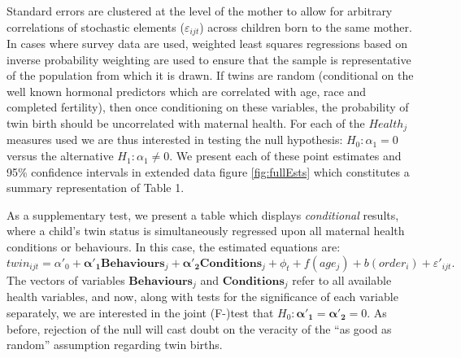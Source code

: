\documentclass{nature}
\begin{document}
\begin{linenumbers}
Standard errors are clustered at the level of the mother to allow for arbitrary correlations of stochastic elements ($\varepsilon_{ijt}$) across children born to the same mother. In cases where survey data are used, weighted least squares regressions based on inverse probability weighting are used to ensure that the sample is representative of the population from which it is drawn. If twins are random (conditional on the well known  hormonal predictors which are correlated with age, race and completed fertility\cite{Hall2003}), then once conditioning on these variables, the probability of twin birth should be uncorrelated with maternal health. For each of the $Health_j$ measures used we are thus interested in testing the null hypothesis: $H_0: \alpha_1=0$ versus the alternative $H_1: \alpha_1\neq0$.  We present each of these point estimates and 95\% confidence intervals in extended data figure \ref{fig:fullEsts} which constitutes a summary representation of Table 1. %

As a supplementary test, we present a table which displays \emph{conditional} results, where a child's twin status is simultaneously regressed upon all maternal health conditions or behaviours.  In this case, the estimated equations are:
\begin{equation}
  \label{reg:twincond}
  twin_{ijt}=\alpha'_0 + \bm{\alpha'_1} \bm{Behaviours}_j + \bm{\alpha'_2} \bm{Conditions}_j + \phi_t + f(age_j) + b(order_i) + \varepsilon'_{ijt}.
\end{equation}
The vectors of variables $\bm{Behaviours}_j$ and $\bm{Conditions}_j$ refer to all available health variables, and now, along with tests for the significance of each variable separately, we are interested in the joint (F-)test that $H_0:\bm{\alpha'_1}=\bm{\alpha'_2}=0$.  As before, rejection of the null will cast doubt on the veracity of the ``as good as random'' assumption regarding twin births.



\end{linenumbers}
\end{document}
